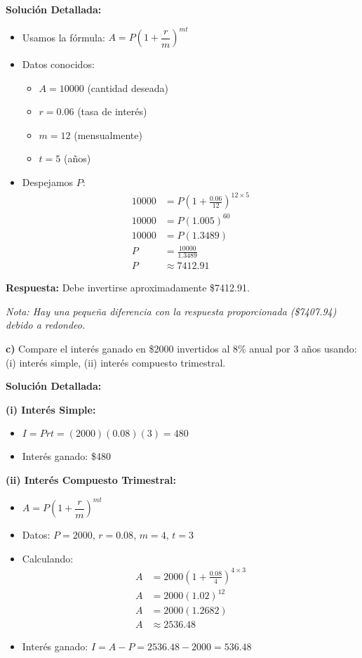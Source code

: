 \textbf{Solución Detallada:}
\begin{itemize}
    \item Usamos la fórmula: $A = P\left(1 + \dfrac{r}{m}\right)^{mt}$
    \item Datos conocidos:
    \begin{itemize}
        \item $A = 10000$ (cantidad deseada)
        \item $r = 0.06$ (tasa de interés)
        \item $m = 12$ (mensualmente)
        \item $t = 5$ (años)
    \end{itemize}
    \item Despejamos $P$:
    \begin{align*}
    10000 &= P\left(1 + \frac{0.06}{12}\right)^{12 \times 5} \\
    10000 &= P(1.005)^{60} \\
    10000 &= P(1.3489) \\
    P &= \frac{10000}{1.3489} \\
    P &\approx 7412.91
    \end{align*}
\end{itemize}

\textbf{Respuesta:} Debe invertirse aproximadamente \$7412.91.

\textit{Nota: Hay una pequeña diferencia con la respuesta proporcionada (\$7407.94) debido a redondeo.}

\medskip

\textbf{c)} Compare el interés ganado en \$2000 invertidos al 8\% anual por 3 años usando: (i) interés simple, (ii) interés compuesto trimestral.

\textbf{Solución Detallada:}

\textbf{(i) Interés Simple:}
\begin{itemize}
    \item $I = Prt = (2000)(0.08)(3) = 480$
    \item Interés ganado: \$480
\end{itemize}

\textbf{(ii) Interés Compuesto Trimestral:}
\begin{itemize}
    \item $A = P\left(1 + \dfrac{r}{m}\right)^{mt}$
    \item Datos: $P = 2000$, $r = 0.08$, $m = 4$, $t = 3$
    \item Calculando:
    \begin{align*}
    A &= 2000\left(1 + \frac{0.08}{4}\right)^{4 \times 3} \\
    A &= 2000(1.02)^{12} \\
    A &= 2000(1.2682) \\
    A &\approx 2536.48
    \end{align*}
    \item Interés ganado: $I = A - P = 2536.48 - 2000 = 536.48$
\end{itemize}

